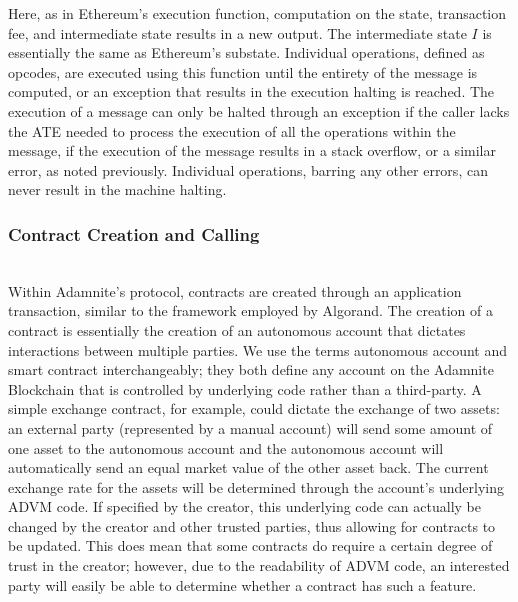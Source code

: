\documentclass[conference]{IEEEtran}
\begin{document}
Here, as in Ethereum's execution function, computation on the state, transaction fee, and intermediate state results in a new output. The intermediate state $I$ is essentially the same as Ethereum's substate. Individual operations, defined as opcodes, are executed using this function until the entirety of the message is computed, or an exception that results in the execution halting is reached. The execution of a message can only be halted through an exception if the caller lacks the ATE needed to process the execution of all the operations within the message, if the execution of the message results in a stack overflow, or a similar error, as noted previously. Individual operations, barring any other errors, can never result in the machine halting.\\

\subsubsection{Contract Creation and Calling}\\
Within Adamnite's protocol, contracts are created through an application transaction, similar to the framework employed by Algorand. The creation of a contract is essentially the creation of an autonomous account that dictates interactions between multiple parties. We use the terms autonomous account and smart contract interchangeably; they both define any account on the Adamnite Blockchain that is controlled by underlying code rather than a third-party. A simple exchange contract, for example, could dictate the exchange of two assets: an external party (represented by a manual account) will send some amount of one asset to the autonomous account and the autonomous account will automatically send an equal market value of the other asset back. The current exchange rate for the assets will be determined through the account's underlying ADVM code. If specified by the creator, this underlying code can actually be changed by the creator and other trusted parties, thus allowing for contracts to be updated. This does mean that some contracts do require a certain degree of trust in the creator; however, due to the readability of ADVM code, an interested party will easily be able to determine whether a contract has such a feature.\\
\end{document}
